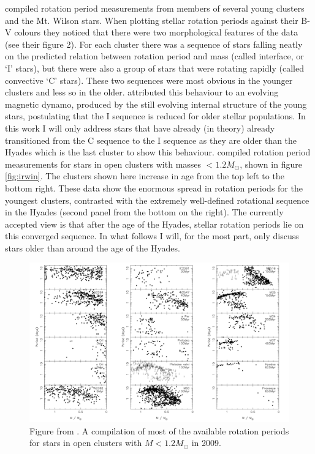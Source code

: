 \citet{Barnes2003} compiled rotation period measurements from members of
several young clusters and the Mt. Wilson stars.
When plotting stellar rotation periods against their B-V colours they noticed
that there were two morphological features of the data (see their figure 2).
For each cluster there was a sequence of stars falling neatly on the predicted
relation between rotation period and mass (called interface, or `I' stars),
but there were also a group of stars that were rotating rapidly (called
convective `C' stars).
These two sequences were most obvious in the younger clusters and less so in
the older.
\citet{Barnes2003} attributed this behaviour to an evolving magnetic dynamo,
produced by the still evolving internal structure of the young stars,
postulating that the I sequence is reduced for older stellar populations.
In this work I will only address stars that have already (in theory) already
transitioned from the C sequence to the I sequence as they are older than the
Hyades which is the last cluster to show this behaviour.
\citet{Irwin2009} compiled rotation period measurements for stars in open
clusters with masses $< 1.2 M_\odot$, shown in figure \ref{fig:irwin}.
The clusters shown here increase in age from the top left to the bottom right.
These data show the enormous spread in rotation periods for the youngest
clusters, contrasted with the extremely well-defined rotational sequence in
the Hyades (second panel from the bottom on the right).
The currently accepted view is that after the age of the Hyades, stellar
rotation periods lie on this converged sequence.
In what follows I will, for the most part, only discuss stars older than
around the age of the Hyades.

\begin{figure}[p]
\begin{center}
\includegraphics[width=6in, clip=true]{figures/irwin.pdf}
\caption[Cluster rotation from \citet{Irwin2009}]
{Figure from \citet{Irwin2009}. A compilation of most of the available
rotation periods for stars in open clusters with $M < 1.2 M_\odot$ in 2009.}
\label{fig:solar_spectrum}
\end{center}
\end{figure}

